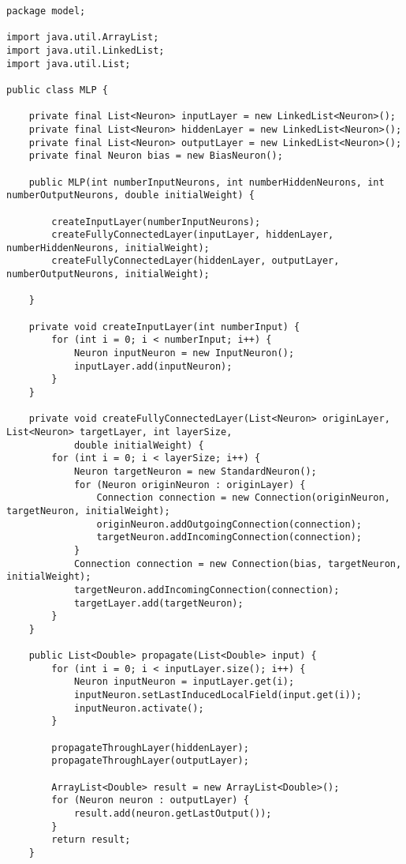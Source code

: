 \documentclass[paper=a4, fontsize=11pt]{scrartcl} %
\numberwithin{equation}{section} %
\numberwithin{figure}{section} %
\numberwithin{table}{section} %
\begin{document}
\begin{lstlisting}
package model;

import java.util.ArrayList;
import java.util.LinkedList;
import java.util.List;

public class MLP {

    private final List<Neuron> inputLayer = new LinkedList<Neuron>();
    private final List<Neuron> hiddenLayer = new LinkedList<Neuron>();
    private final List<Neuron> outputLayer = new LinkedList<Neuron>();
    private final Neuron bias = new BiasNeuron();

    public MLP(int numberInputNeurons, int numberHiddenNeurons, int numberOutputNeurons, double initialWeight) {

        createInputLayer(numberInputNeurons);
        createFullyConnectedLayer(inputLayer, hiddenLayer, numberHiddenNeurons, initialWeight);
        createFullyConnectedLayer(hiddenLayer, outputLayer, numberOutputNeurons, initialWeight);

    }

    private void createInputLayer(int numberInput) {
        for (int i = 0; i < numberInput; i++) {
            Neuron inputNeuron = new InputNeuron();
            inputLayer.add(inputNeuron);
        }
    }

    private void createFullyConnectedLayer(List<Neuron> originLayer, List<Neuron> targetLayer, int layerSize,
            double initialWeight) {
        for (int i = 0; i < layerSize; i++) {
            Neuron targetNeuron = new StandardNeuron();
            for (Neuron originNeuron : originLayer) {
                Connection connection = new Connection(originNeuron, targetNeuron, initialWeight);
                originNeuron.addOutgoingConnection(connection);
                targetNeuron.addIncomingConnection(connection);
            }
            Connection connection = new Connection(bias, targetNeuron, initialWeight);
            targetNeuron.addIncomingConnection(connection);
            targetLayer.add(targetNeuron);
        }
    }

    public List<Double> propagate(List<Double> input) {
        for (int i = 0; i < inputLayer.size(); i++) {
            Neuron inputNeuron = inputLayer.get(i);
            inputNeuron.setLastInducedLocalField(input.get(i));
            inputNeuron.activate();
        }

        propagateThroughLayer(hiddenLayer);
        propagateThroughLayer(outputLayer);

        ArrayList<Double> result = new ArrayList<Double>();
        for (Neuron neuron : outputLayer) {
            result.add(neuron.getLastOutput());
        }
        return result;
    }


\end{lstlisting}
\end{document}
